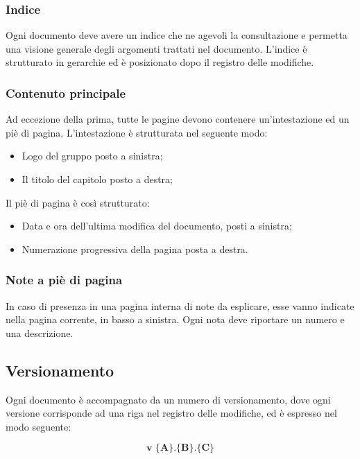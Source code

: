 \documentclass[./../NormediProgetto.tex]{subfiles}
\begin{document}
\subsubsection{Indice}

Ogni documento deve avere un indice che ne agevoli la consultazione e permetta una visione generale degli argomenti trattati nel documento. L'indice è strutturato in gerarchie ed è posizionato dopo il registro delle modifiche.

\subsubsection{Contenuto principale}

 Ad eccezione della prima, tutte le pagine devono contenere un’intestazione ed un piè di pagina. L’intestazione è strutturata nel seguente modo: 

\begin{itemize}
\item Logo del gruppo posto a sinistra;
\item Il titolo del capitolo posto a destra;
\end{itemize}

Il piè di pagina è così strutturato:

\begin{itemize}
\item Data e ora dell'ultima modifica del documento, posti a sinistra;
\item Numerazione progressiva della pagina posta a destra.
\end{itemize}

\subsubsection{Note a piè di pagina}

In caso di presenza in una pagina interna di note da esplicare, esse vanno indicate nella pagina corrente, in basso a sinistra. Ogni nota deve riportare un numero e una descrizione.

\subsection{Versionamento}

Ogni documento è accompagnato da un numero di versionamento, dove ogni versione corrisponde ad una riga nel registro delle modifiche, ed è espresso nel modo seguente:

\[\textbf{v $\biggl\{$A$\biggr\}$.$\biggl\{$B$\biggr\}$.$\biggl\{$C$\biggr\}$}\]
\end{document}
